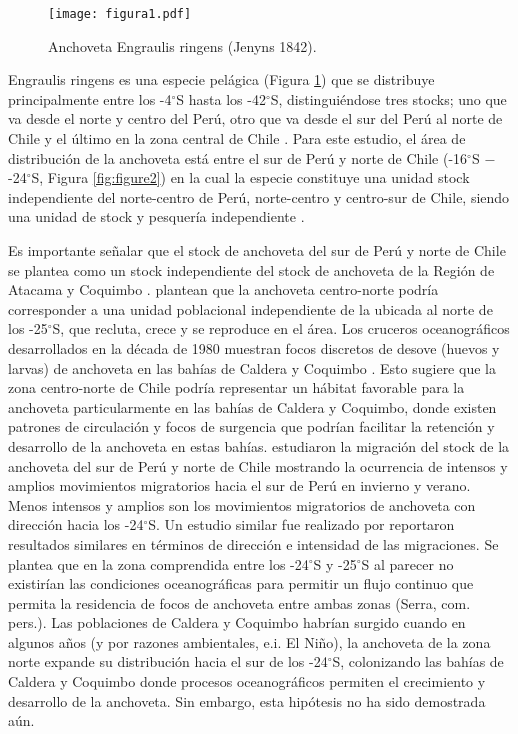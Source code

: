 
\begin{figure}[h]
    \centering
    \texttt{[image: figura1.pdf]}  
    \caption{Anchoveta Engraulis ringens (Jenyns 1842).}
    \label{fig:figure1}
\end{figure}  

Engraulis ringens es una especie pelágica (Figura \ref{fig:figure1}) que se distribuye principalmente entre los -4$^\circ$S hasta los -42$^\circ$S, distinguiéndose tres stocks; uno que va desde el norte y centro del Perú, otro que va desde el sur del Perú al norte de Chile y el último en la zona central de Chile \citep{claramunt2012inter}. Para este estudio, el área de distribución de la anchoveta está entre el sur de Perú y norte de Chile (-16$^\circ$S $-$ -24$^\circ$S, Figura \ref{fig:figure2}) en la cual la especie constituye una unidad stock independiente del norte-centro de Perú, norte-centro y centro-sur de Chile, siendo una unidad de stock y pesquería independiente \citep{cubillos2007synchronous}.
\newline

Es importante señalar que el stock de anchoveta del sur de Perú y norte de Chile se plantea como un stock independiente del stock de anchoveta de la Región de Atacama y Coquimbo \citep{serra2012final}. \cite{canales2009parametros} plantean que la anchoveta centro-norte podría corresponder a una unidad poblacional independiente de la ubicada al norte de los -25$^\circ$S, que recluta, crece y se reproduce en el área. Los cruceros oceanográficos desarrollados en la década de 1980 muestran focos discretos de desove (huevos y larvas) de anchoveta en las bahías de Caldera y Coquimbo \citep{rojas1983estimacion}. Esto sugiere que la zona centro-norte de Chile podría representar un hábitat favorable para la anchoveta particularmente en las bahías de Caldera y Coquimbo, donde existen patrones de circulación y focos de surgencia \citep{valle2006observations} que podrían facilitar la retención y desarrollo de la anchoveta en estas bahías. \cite{sg} estudiaron la migración del stock de la anchoveta del sur de Perú y norte de Chile mostrando la ocurrencia de intensos y amplios movimientos migratorios hacia el sur de Perú en invierno y verano. Menos intensos y amplios son los movimientos migratorios de anchoveta con dirección hacia los -24$^\circ$S. Un estudio similar fue realizado por \cite{martinez1998informe} reportaron resultados similares en términos de dirección e intensidad de las migraciones. Se plantea que en la zona comprendida entre los -24$^\circ$S y -25$^\circ$S al parecer no existirían las condiciones oceanográficas para permitir un flujo continuo que permita la residencia de focos de anchoveta entre ambas zonas (Serra, com. pers.). Las poblaciones de Caldera y Coquimbo habrían surgido cuando en algunos años (y por razones ambientales, e.i. El Niño), la anchoveta de la zona norte expande su distribución hacia el sur de los -24$^\circ$S, colonizando las bahías de Caldera y Coquimbo donde procesos oceanográficos permiten el crecimiento y desarrollo de la anchoveta. Sin embargo, esta hipótesis no ha sido demostrada aún.

